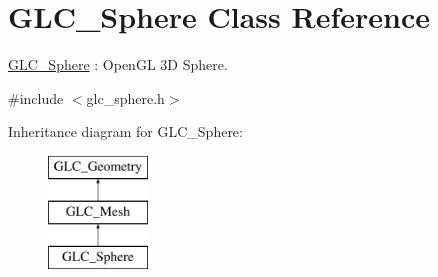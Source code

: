 \hypertarget{class_g_l_c___sphere}{\section{G\-L\-C\-\_\-\-Sphere Class Reference}
\label{class_g_l_c___sphere}
}


\hyperlink{class_g_l_c___sphere}{G\-L\-C\-\_\-\-Sphere} \-: Open\-G\-L 3\-D Sphere.  




{\ttfamily \#include $<$glc\-\_\-sphere.\-h$>$}

Inheritance diagram for G\-L\-C\-\_\-\-Sphere\-:\begin{figure}[H]
\begin{center}
\leavevmode
\includegraphics[height=3.000000cm]{class_g_l_c___sphere}
\end{center}
\end{figure}
